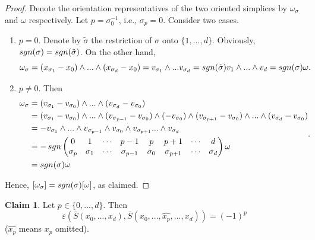 \documentclass{elsarticle}
\theoremstyle{definition}
\newtheorem{claim}[theorem]{Claim}
\newcommand{\sgn}{\mathop{\rm sgn}\nolimits}   %
\begin{document}
\begin{proof}
  Denote the orientation representatives of the two oriented simplices by $\omega_{\sigma}$ and $\omega$ respectively. Let $p = \sigma^{-1}_0$, i.e., $\sigma_p = 0$. Consider two cases.
  \begin{enumerate}
    \item
      $p = 0$. Denote by $\tilde{\sigma}$ the restriction of $\sigma$ onto $\{1, ..., d\}$. Obviously, $\sgn(\sigma) = \sgn( \tilde{\sigma})$. On the other hand,
      \begin{equation*}
        \omega_{\sigma}
          = (x_{\sigma_1} - x_0) \wedge ... \wedge (x_{\sigma_d} - x_0) 
          = v_{\sigma_1} \wedge ... v_{\sigma_d} = \sgn(\tilde{\sigma}) v_1 \wedge ... \wedge v_d = \sgn(\sigma) \omega.
      \end{equation*}
    \item
      $p \neq 0$. Then
      \begin{equation*}
        \begin{split}
          \omega_{\sigma}
            & = (v_{\sigma_1} - v_{\sigma_0}) \wedge ... \wedge (v_{\sigma_d} - v_{\sigma_0}) \\
            & = (v_{\sigma_1} - v_{\sigma_0}) \wedge ... \wedge (v_{\sigma_{p - 1}} - v_{\sigma_0}) \wedge (-v_{\sigma_0}) \wedge (v_{\sigma_{p + 1}} - v_{\sigma_0}) \wedge ... \wedge (v_{\sigma_d} - v_{\sigma_0}) \\
            & = - v_{\sigma_1} \wedge ... \wedge v_{\sigma_{p - 1}} \wedge v_{\sigma_0} \wedge v_{\sigma_{p + 1}} ... \wedge v_{\sigma_d} \\
            & = - \sgn
              \begin{pmatrix}
                0 & 1 & \cdots & p - 1 & p & p + 1 & \cdots & d \\
                \sigma_p & \sigma_1 &  \cdots & \sigma_{p - 1} & \sigma_0 & \sigma_{p + 1}& \cdots & \sigma_d
              \end{pmatrix}
              \omega \\ 
            & = \sgn(\sigma) \omega
        \end{split}.
      \end{equation*}
  \end{enumerate}
  Hence, $[\omega_{\sigma}] = \sgn(\sigma) [\omega]$, as claimed.
\end{proof}
\begin{claim}
  Let $p \in \{0, ..., d\}$. Then
  \begin{equation}
    \varepsilon
      \left(
        \overline{S}(x_{0}, ..., x_{d}),
        \overline{S}(x_{0}, ...,  \widehat{x_{p}}, ..., x_{d})
      \right)
      = (-1)^p
  \end{equation}
  ($\widehat{x_{p}}$ means $x_p$ omitted).
\end{claim}
\end{document}
